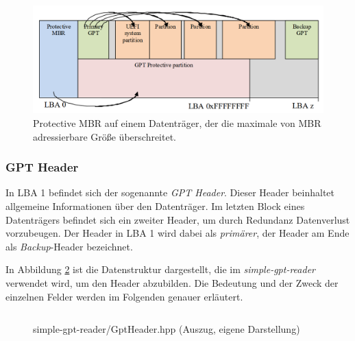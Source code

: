 \begin{figure}[ht!]
    \includegraphics[width=\textwidth]{content/graphics/GPT_Layout_with_protective_MBR_large_disk.png}
    
    \vspace{-0.2cm}

    \caption{Protective MBR auf einem Datenträger, der die maximale von MBR adressierbare Größe überschreitet.\cite{uefi-spec}}
    \label{fig:protective-mbr-large-disk}
\end{figure}


\newpage
\subsubsection{GPT Header}
In LBA 1 befindet sich der sogenannte \textit{GPT Header}.
Dieser Header beinhaltet allgemeine Informationen über den Datenträger.
Im letzten Block eines Datenträgers befindet sich ein zweiter Header, um durch Redundanz Datenverlust vorzubeugen.
Der Header in LBA 1 wird dabei als \textit{primärer}, der Header am Ende als \textit{Backup}-Header bezeichnet.

In Abbildung \ref{fig:GptHeader.hpp} ist die Datenstruktur dargestellt, die im \textit{simple-gpt-reader} verwendet wird, um den Header abzubilden.
Die Bedeutung und der Zweck der einzelnen Felder werden im Folgenden genauer erläutert.

\begin{figure}[ht]
    \inputminted[baselinestretch=1.2, tabsize=4, breaklines, frame=single]{c++}{content/code/simple-gpt-reader/GptHeader.hpp}
    
    \vspace{-0.5cm}

    \caption{simple-gpt-reader/GptHeader.hpp (Auszug, eigene Darstellung)}
    \label{fig:GptHeader.hpp}
\end{figure}

